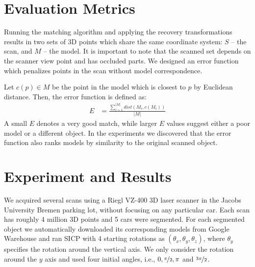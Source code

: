 \documentclass{llncs}
\begin{document}
\section{Evaluation Metrics}

Running the matching algorithm and applying the recovery
transformations results in two sets of 3D points which share the same
coordinate system: $S$ -- the scan, and $M$ -- the model. It is
important to note that the scanned set depends on the scanner view
point and has occluded parts. We designed an error function which
penalizes points in the scan without model correspondence.

Let $c(p) \in M$ be the point in the model which is closest to $p$ by
Euclidean distance. Then, the error function is defined as:
%
\begin{align*}
	E &= \frac{\sum_{i=1}^{|M|} dist(M_i, c(M_i))}{|M|}
\end{align*}
%
A small $E$ denotes a very good match, while larger $E$ values suggest
either a poor model or a different object. In the experiments we
discovered that the error function also ranks models by similarity to
the original scanned object.

\section{Experiment and Results}

We acquired several scans using a Riegl VZ-400 3D laser scanner in the
Jacobs University Bremen parking lot, without focusing on any
particular car. Each scan has roughly 4 million 3D points and 5 cars
were segmented. For each segmented object we automatically downloaded
its corresponding models from Google Warehouse and ran SICP with 4
starting rotations as $(\theta_x,\theta_y,\theta_z)$, where $\theta_y$
specifies the rotation around the vertical axis. We only consider the
rotation around the $y$ axis and used four initial angles, i.e., $0,
\nicefrac{\pi}{2}, \pi$ and $\nicefrac{3\pi}{2}$. 
\end{document}
